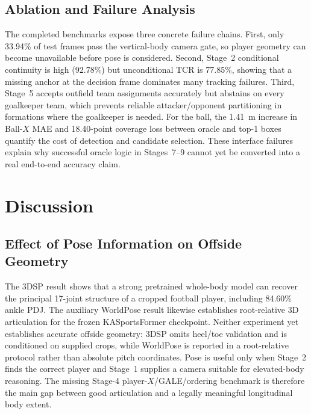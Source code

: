 \documentclass[runningheads]{llncs}
\begin{document}
\subsection{Ablation and Failure Analysis}
\label{subsec:results_failure}
The completed benchmarks expose three concrete failure chains. First, only 33.94\% of test frames pass the vertical-body camera gate, so player geometry can become unavailable before pose is considered. Second, Stage~2 conditional continuity is high (92.78\%) but unconditional TCR is 77.85\%, showing that a missing anchor at the decision frame dominates many tracking failures. Third, Stage~5 accepts outfield team assignments accurately but abstains on every goalkeeper team, which prevents reliable attacker/opponent partitioning in formations where the goalkeeper is needed. For the ball, the 1.41~m increase in Ball-$X$ MAE and 18.40-point coverage loss between oracle and top-1 boxes quantify the cost of detection and candidate selection. These interface failures explain why successful oracle logic in Stages~7--9 cannot yet be converted into a real end-to-end accuracy claim.

\section{Discussion}
\label{sec:discussion}

\subsection{Effect of Pose Information on Offside Geometry}
The 3DSP result shows that a strong pretrained whole-body model can recover the principal 17-joint structure of a cropped football player, including 84.60\% ankle PDJ. The auxiliary WorldPose result likewise establishes root-relative 3D articulation for the frozen KASportsFormer checkpoint. Neither experiment yet establishes accurate offside geometry: 3DSP omits heel/toe validation and is conditioned on supplied crops, while WorldPose is reported in a root-relative protocol rather than absolute pitch coordinates. Pose is useful only when Stage~2 finds the correct player and Stage~1 supplies a camera suitable for elevated-body reasoning. The missing Stage-4 player-$X$/GALE/ordering benchmark is therefore the main gap between good articulation and a legally meaningful longitudinal body extent.
\end{document}
